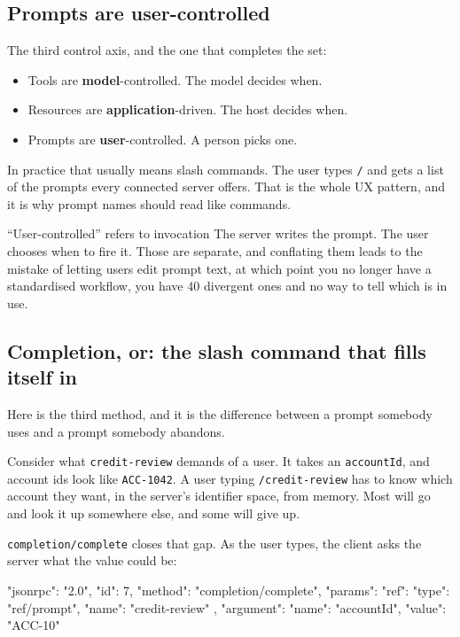 \subsection{Prompts are user-controlled}

The third control axis, and the one that completes the set:

\begin{itemize}[leftmargin=1.6em, itemsep=2pt]
\item Tools are \textbf{model}-controlled. The model decides when.
\item Resources are \textbf{application}-driven. The host decides when.
\item Prompts are \textbf{user}-controlled. A person picks one.
\end{itemize}

In practice that usually means slash commands. The user types \texttt{/} and
gets a list of the prompts every connected server offers. That is the whole UX
pattern, and it is why prompt names should read like commands.

\begin{notebox}{``User-controlled'' refers to invocation}
The server writes the prompt. The user chooses when to fire it. Those are
separate, and conflating them leads to the mistake of letting users edit prompt
text, at which point you no longer have a standardised workflow, you have 40
divergent ones and no way to tell which is in use.
\end{notebox}

\subsection{Completion, or: the slash command that fills itself in}
\label{sec:prompt-completion}

Here is the third method, and it is the difference between a prompt somebody
uses and a prompt somebody abandons.

Consider what \texttt{credit-review} demands of a user. It takes an
\texttt{accountId}, and account ids look like \texttt{ACC-1042}. A user typing
\texttt{/credit-review} has to know which account they want, in the server's
identifier space, from memory. Most will go and look it up somewhere else, and
some will give up.

\texttt{completion/complete} closes that gap. As the user types, the client asks
the server what the value could be:

\begin{wire}
{
  "jsonrpc": "2.0",
  "id": 7,
  "method": "completion/complete",
  "params": {
    "ref": { "type": "ref/prompt", "name": "credit-review" },
    "argument": { "name": "accountId", "value": "ACC-10" }
  }
}
\end{wire}

